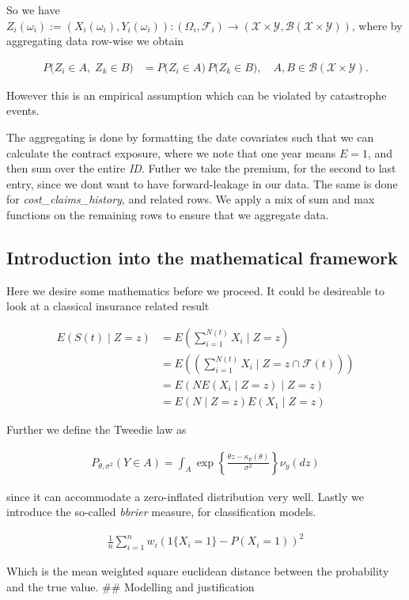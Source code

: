 \documentclass[
]{article}
\begin{document}
So we have
\(Z_i(\omega_i) := (X_i(\omega_i), Y_i(\omega_i)): (\Omega_i, \mathcal{F}_i) \rightarrow ( \mathcal{X} \times \mathcal{Y}, \mathcal{B}(\mathcal{X} \times \mathcal{Y}))\),
where by aggregating data row-wise we obtain

\begin{align*}
P\bigl(Z_i \in A,\; Z_k \in B\bigr)
&= P\bigl(Z_i \in A\bigr)\,P\bigl(Z_k \in B\bigr),
\quad A, B \in \mathcal{B}(\mathcal{X}\times\mathcal{Y}).
\end{align*}

However this is an empirical assumption which can be violated by
catastrophe events.

The aggregating is done by formatting the date covariates such that we
can calculate the contract exposure, where we note that one year means
\(E = 1\), and then sum over the entire \emph{ID}. Futher we take the
premium, for the second to last entry, since we dont want to have
forward-leakage in our data. The same is done for
\emph{cost\_claims\_history}, and related rows. We apply a mix of sum
and max functions on the remaining rows to ensure that we aggregate
data.

\subsection{Introduction into the mathematical
framework}\label{introduction-into-the-mathematical-framework}

Here we desire some mathematics before we proceed. It could be
desireable to look at a classical insurance related result

\begin{align*}
E(S(t) \mid Z=z) &= E\left(\sum_{i=1}^{N(t)} X_i \mid Z = z \right)\\
&= E\left( \left( \sum_{i=1}^{N(t)} X_i \mid Z = z \cap \mathcal{F}(t) \right)\right) \\
&=E\left( N E\left( X_i \mid Z = z \right)  \mid Z=z\right) \\
&= E(N \mid Z = z) E(X_1 \mid Z = z)
\end{align*}

Further we define the Tweedie law as

\begin{align*}
P_{\theta, \sigma^2}(Y \in A) = \int_A \exp\left\{ \frac{\theta z - \kappa_p(\theta)}{\sigma^2} \right\}\nu_y(dz)
\end{align*}

since it can accommodate a zero-inflated distribution very well. Lastly
we introduce the so-called \emph{bbrier} measure, for classification
models.

\begin{align*}
\frac{1}{n} \sum_{i=1}^n w_i(1\{X_i = 1 \} - P(X_i = 1))^2
\end{align*}

Which is the mean weighted square euclidean distance between the
probability and the true value. \#\# Modelling and justification
\end{document}

